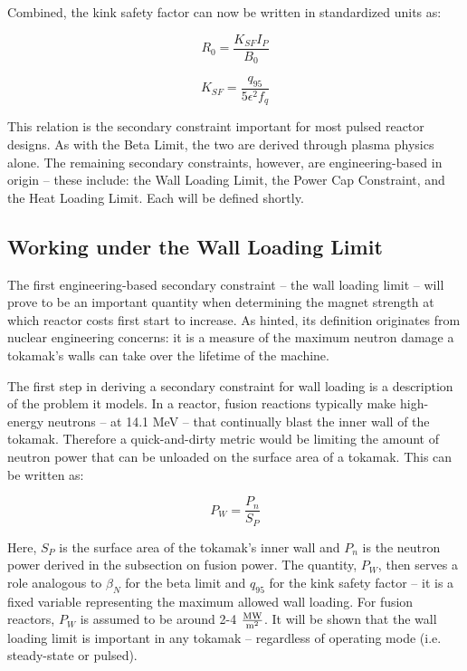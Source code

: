 Combined, the kink safety factor can now be written in standardized units as:

\begin{equation}
   R_0 = \frac{ K_{SF} I_P }{ B_0 }
\end{equation}

\begin{equation}
  K_{SF} = \frac{q_{95}}{5 \epsilon^2 f_q}
\end{equation}

This relation is the secondary constraint important for most pulsed reactor designs. As with the Beta Limit, the two are derived through plasma physics alone. The remaining secondary constraints, however, are engineering-based in origin -- these include: the Wall Loading Limit, the Power Cap Constraint, and the Heat Loading Limit. Each will be defined shortly.

\subsection{Working under the Wall Loading Limit}

The first engineering-based secondary constraint -- the wall loading limit -- will prove to be an important quantity when determining the magnet strength at which reactor costs first start to increase. As hinted, its definition originates from nuclear engineering concerns: it is a measure of the maximum neutron damage a tokamak's walls can take over the lifetime of the machine.

The first step in deriving a secondary constraint for wall loading is a description of the problem it models. In a reactor, fusion reactions typically make high-energy neutrons -- at 14.1 MeV -- that continually blast the inner wall of the tokamak. Therefore a quick-and-dirty metric would be limiting the amount of neutron power that can be unloaded on the surface area of a tokamak. This can be written as:

\begin{equation}
	P_W = \frac{ P_n }{ S_P }
\end{equation}

Here, $S_P$ is the surface area of the tokamak's inner wall and $P_n$ is the neutron power derived in the subsection on fusion power. The quantity, $P_W$, then serves a role analogous to $\beta_N$ for the beta limit and $q_{95}$ for the kink safety factor -- it is a fixed variable representing the maximum allowed wall loading. For fusion reactors, $P_W$ is assumed to be around 2-4 $\frac{\textnormal{MW}}{\textnormal{m}^2}$. It will be shown that the wall loading limit is important in any tokamak -- regardless of operating mode (i.e. steady-state or pulsed).

